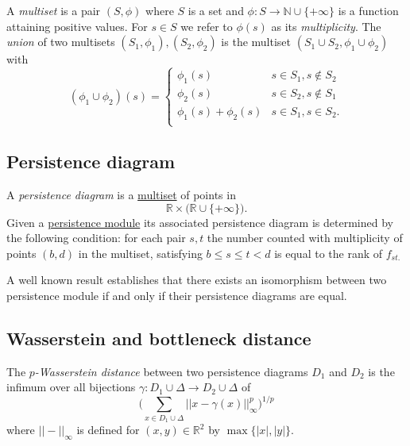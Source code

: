\documentclass{amsart}
\begin{document}
	A \textit{multiset} is a pair $(S, \phi)$ where $S$ is a set and $\phi : S \to \mathbb N \cup \{+\infty\}$ is a function attaining positive values. For $s \in S$ we refer to $\phi(s)$ as its \textit{multiplicity}. The \textit{union} of two multisets $(S_1, \phi_1), (S_2, \phi_2)$ is the multiset $(S_1 \cup S_2, \phi_1 \cup \phi_2)$ with
	\begin{equation*}
	(\phi_1 \cup \phi_2)(s) = 
	\begin{cases}
	\phi_1(s) & s \in S_1, s \not\in S_2 \\
	\phi_2(s) & s \in S_2, s \not\in S_1 \\
	\phi_1(s) + \phi_2(s) & s \in S_1, s \in S_2. \\
	\end{cases}
	\end{equation*}
	
	\subsection*{Persistence diagram} \label{persistence diagram}
	
	A \textit{persistence diagram} is a \hyperref[multiset]{multiset} of points in
	\begin{equation*}
	\mathbb R \times \big( \mathbb{R} \cup \{+\infty\} \big).
	\end{equation*}	
	Given a \hyperref[persistence module]{persistence module} its associated persistence diagram is determined by the following condition: for each pair $s,t$ the number counted with multiplicity of points $(b,d)$ in the multiset, satisfying $b \leq s \leq t < d$ is equal to the rank of $f_{st.}$
	
	A well known result establishes that there exists an isomorphism between two persistence module if and only if their persistence diagrams are equal.
	
	\subsection*{Wasserstein and bottleneck distance}	\label{wasserstein and bottleneck distance}
	
	The \textit{$p$-Wasserstein distance} between two persistence diagrams $D_1$ and $D_2$ is the infimum over all bijections $\gamma: D_1 \cup \Delta \to D_2 \cup \Delta$ of
	\begin{equation*}
	\Big(\sum_{x \in D_1 \cup \Delta} ||x - \gamma(x)||_\infty^p \Big)^{1/p}
	\end{equation*}
	where $||-||_\infty$ is defined for $(x,y) \in \mathbb R^2$ by $\max\{|x|, |y|\}$. 
	
\end{document}
